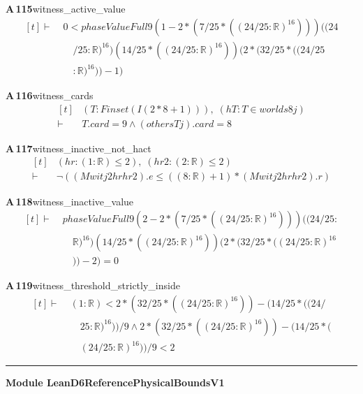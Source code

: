 \documentclass[conference]{IEEEtran}
\theoremstyle{definition}
\newcommand{\lean}[1]{\textsf{\footnotesize #1}}
\begin{document}
\noindent\textbf{A\,115}\quad\lean{witness\_active\_value}
{\footnotesize\[ \begin{aligned}[t]
\vdash\;&0 < \mathit{phaseValueFull} 9 (1-2*(7/25*((24/25:\mathbb{R} )^{16}))) ((24\\
&\quad /25:\mathbb{R} )^{16}) (14/25*((24/25:\mathbb{R} )^{16})) (2*(32/25*((24/25\\
&\quad :\mathbb{R} )^{16}))-1)
\end{aligned} \]}

\noindent\textbf{A\,116}\quad\lean{witness\_cards}
{\footnotesize\[ \begin{aligned}[t]
&(\mathit{T} : \mathit{Finset} (\mathit{I} (2*8+1))),\; (\mathit{hT} : \mathit{T} \in \mathit{worlds} 8 \mathit{j})\\
\vdash\;&\mathit{T}.\mathit{card} = 9 \wedge (\mathit{others} \mathit{T} \mathit{j}).\mathit{card} = 8
\end{aligned} \]}

\noindent\textbf{A\,117}\quad\lean{witness\_inactive\_not\_hact}
{\footnotesize\[ \begin{aligned}[t]
&(\mathit{hr} : (1:\mathbb{R} ) \leq 2),\; (\mathit{hr2} : (2:\mathbb{R} ) \leq 2)\\
\vdash\;&\neg ((\mathit{Mwit} \mathit{j} 2 \mathit{hr} \mathit{hr2}).\mathit{e} \leq ((8:\mathbb{R} )+1)*(\mathit{Mwit} \mathit{j} 2 \mathit{hr} \mathit{hr2}).\mathit{r})
\end{aligned} \]}

\noindent\textbf{A\,118}\quad\lean{witness\_inactive\_value}
{\footnotesize\[ \begin{aligned}[t]
\vdash\;&\mathit{phaseValueFull} 9 (2-2*(7/25*((24/25:\mathbb{R} )^{16}))) ((24/25:\\
&\quad \mathbb{R} )^{16}) (14/25*((24/25:\mathbb{R} )^{16})) (2*(32/25*((24/25:\mathbb{R} )^{16}\\
&\quad ))-2) = 0
\end{aligned} \]}

\noindent\textbf{A\,119}\quad\lean{witness\_threshold\_strictly\_inside}
{\footnotesize\[ \begin{aligned}[t]
\vdash\;&(1:\mathbb{R} ) < 2*(32/25*((24/25:\mathbb{R} )^{16}))-(14/25*((24/\\
&\quad 25:\mathbb{R} )^{16}))/9 \wedge 2*(32/25*((24/25:\mathbb{R} )^{16}))-(14/25*(\\
&\quad (24/25:\mathbb{R} )^{16}))/9 < 2
\end{aligned} \]}

\vspace{4pt}\noindent\rule{\columnwidth}{0.4pt}\par\vspace{2pt}
\noindent\textbf{Module \lean{LeanD6ReferencePhysicalBoundsV1}}\par\vspace{3pt}
\end{document}
